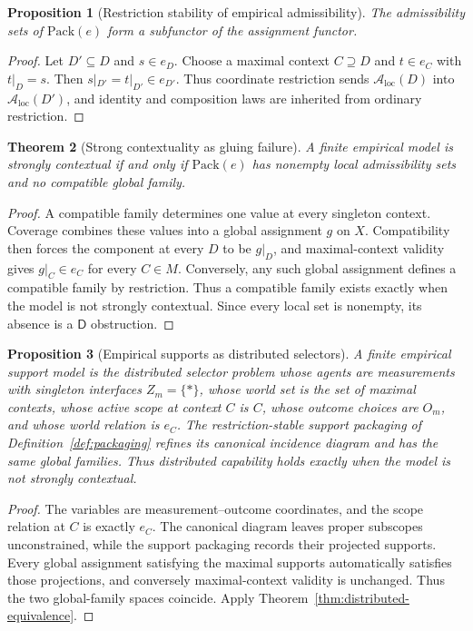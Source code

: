 \documentclass[11pt]{article}
\theoremstyle{plain}
\newtheorem{theorem}{Theorem}[section]
\newtheorem{proposition}[theorem]{Proposition}
\theoremstyle{definition}
\theoremstyle{remark}
\newcommand{\LocalAdm}{\mathcal{A}_{\mathrm{loc}}}
\begin{document}
\begin{proposition}[Restriction stability of empirical admissibility]\label{prop:empirical-subfunctor}
The admissibility sets of $\mathrm{Pack}(e)$ form a subfunctor of the assignment
functor.
\end{proposition}

\begin{proof}
Let $D'\subseteq D$ and $s\in e_D$. Choose a maximal context $C\supseteq D$ and
$t\in e_C$ with $t|_D=s$. Then
$s|_{D'}=t|_{D'}\in e_{D'}$. Thus coordinate restriction sends
$\LocalAdm(D)$ into $\LocalAdm(D')$, and identity and composition laws are
inherited from ordinary restriction.
\end{proof}

\begin{theorem}[Strong contextuality as gluing failure]\label{thm:KSfin}
A finite empirical model is strongly contextual if and only if
$\mathrm{Pack}(e)$ has nonempty local admissibility sets and no compatible
global family.
\end{theorem}

\begin{proof}
A compatible family determines one value at every singleton context. Coverage
combines these values into a global assignment $g$ on $X$. Compatibility then
forces the component at every $D$ to be $g|_D$, and maximal-context validity
gives $g|_C\in e_C$ for every $C\in M$. Conversely, any such global assignment
defines a compatible family by restriction. Thus a compatible family exists
exactly when the model is not strongly contextual. Since every local set is
nonempty, its absence is a $\mathsf D$ obstruction.
\end{proof}

\begin{proposition}[Empirical supports as distributed selectors]
\label{prop:empirical-distributed}
A finite empirical support model is the distributed selector problem whose
agents are measurements with singleton interfaces $Z_m=\{\ast\}$, whose world
set is the set of maximal contexts, whose active scope at context $C$ is $C$,
whose outcome choices are $O_m$, and whose
world relation is $e_C$. The restriction-stable support packaging of
Definition~\ref{def:packaging} refines its canonical incidence diagram and has
the same global families. Thus distributed capability holds exactly when the model
is not strongly contextual.
\end{proposition}

\begin{proof}
The variables are measurement--outcome coordinates, and the scope relation at
$C$ is exactly $e_C$. The canonical diagram leaves proper subscopes
unconstrained, while the support packaging records their projected supports.
Every global assignment satisfying the maximal supports automatically satisfies
those projections, and conversely maximal-context validity is unchanged. Thus
the two global-family spaces coincide. Apply
Theorem~\ref{thm:distributed-equivalence}.
\end{proof}
\end{document}
